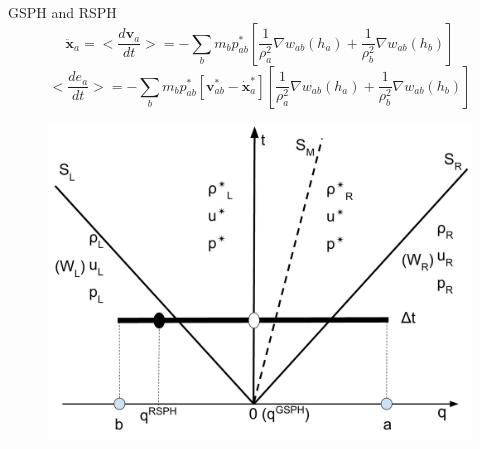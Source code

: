 \documentclass{beamer}
\begin{document}
\begin{frame}{GSPH and RSPH}
\begin{equation}
\ddot{\textbf{x}}_{a} = <\dfrac{d \textbf{v}_{a}}{dt}>= -\sum_{b} m_{b} p_{a b}^{\ast} \left[\frac{1}{\rho_{a}^2} \nabla w_{a b}(h_{a}) + \frac{1}{\rho_{b}^2} \nabla w_{a b}(h_{b}) \right]
\label{eq:gov-gsph-v-simple-form}
\end{equation}
\begin{equation}
<\dfrac{d e_{a}}{dt}>= - \sum_{b} m_{b} p_{a b}^{\ast} [\textbf{v}_{a b}^{\ast} - \dot{\textbf{x}}_{a}^{\ast}] \left[\frac{1}{\rho_{a}^2} \nabla w_{a b}(h_{a}) + \frac{1}{\rho_{b}^2} \nabla w_{a b}(h_{b}) \right]
\label{eq:gov-gsph-e-simple-form}
\end{equation}

\begin{figure}
    \center
	\includegraphics[width=0.5 \textwidth]{./Chapter-4/Figures/RSPH-GSPH}
    \label{fig:pick-up-state-GSPH-RSPH}
\end{figure}
\end{frame}
\end{document}
